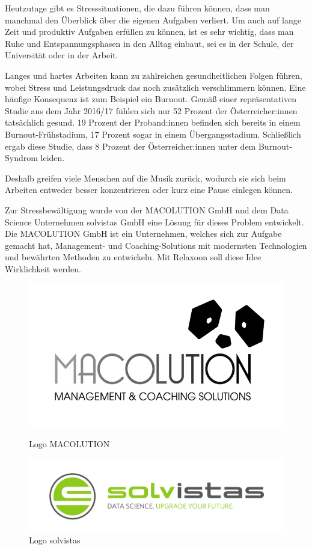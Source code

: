 
Heutzutage gibt es Stresssituationen, die dazu führen können, dass man manchmal den Überblick über die 
eigenen Aufgaben verliert. Um auch auf lange Zeit und produktiv Aufgaben erfüllen zu können, ist es sehr 
wichtig, dass man Ruhe und Entspannungsphasen in den Alltag einbaut, sei es in der Schule, der Universität
oder in der Arbeit. 

Langes und hartes Arbeiten kann zu zahlreichen gesundheitlichen Folgen führen, wobei Stress und 
Leistungsdruck das noch zusätzlich verschlimmern können. Eine häufige Konsequenz ist zum Beispiel
ein Burnout. Gemäß einer repräsentativen Studie \cite{burnout} aus dem Jahr 2016/17 fühlen sich nur 52 Prozent der 
Österreicher:innen tatsächlich gesund. 19 Prozent der Proband:innen befinden sich bereits in einem 
Burnout-Frühstadium, 17 Prozent sogar in einem Übergangsstadium. Schließlich ergab diese Studie, dass 
8 Prozent der Österreicher:innen unter dem Burnout-Syndrom leiden. 

Deshalb greifen viele Menschen
auf die Musik zurück, wodurch sie sich beim Arbeiten entweder besser konzentrieren oder kurz
eine Pause einlegen können.

Zur Stressbewältigung wurde von der MACOLUTION GmbH und dem Data Science Unternehmen solvistas GmbH
eine Lösung für dieses Problem entwickelt. 
Die MACOLUTION GmbH ist ein Unternehmen, welches sich zur Aufgabe gemacht hat,
Management- und Coaching-Solutions mit modernsten Technologien und bewährten Methoden zu entwickeln.
\cite{MACOLUTION}
Mit Relaxoon soll diese Idee Wirklichkeit werden.

\begin{figure}[H]
    \hspace{-0.5cm}
    \begin{minipage}{0.5\textwidth}
        \centering
        \includegraphics[height=0.3\textwidth]{./pics/Logo-Macolution.jpg}
        \caption{Logo MACOLUTION}
    \end{minipage}
    \begin{minipage}{0.5\textwidth}
        \centering
        \includegraphics[height=0.3\textwidth]{./pics/Logo-Solvistas.jpg}
        \caption{Logo solvistas}
    \end{minipage}
\end{figure}
